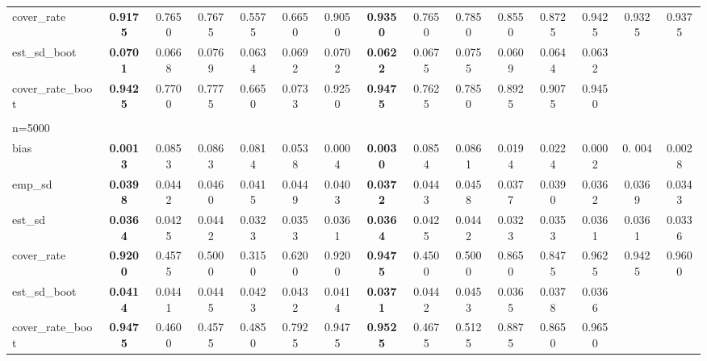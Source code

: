 \documentclass[11pt]{article}
\numberwithin{equation}{section}
\begin{document}
\begin{table}[]
{\begin{tabular}{lcccccccccccccc}
			cover\_rate & \textbf{0.9175} & 0.7650 & 0.7675 & 0.5575 & 0.6650 & 0.9050 & \textbf{0.9350} & 0.7650 & 0.7850 & 0.8550 & 0.8725 & 0.9425 & 0.9325 & 0.9375 \\
			est\_sd\_boot & \textbf{0.0701} & 0.0668 & 0.0769 & 0.0634 & 0.0692 & 0.0702 & \textbf{0.0622} & 0.0675 & 0.0755 & 0.0609 & 0.0644 & 0.0632 &  &  \\
			cover\_rate\_boot & \textbf{0.9425} & 0.7700 & 0.7775 & 0.6650 & 0.0733 & 0.9250 & \textbf{0.9475} & 0.7625 & 0.7850 & 0.8925 & 0.9075 & 0.9450 &  &  \\
			\\
			n=5000 &  &  &  &  &  &  &  &  &  &  &  &  &  &  \\
			\hline
			bias & \textbf{0.0013} & 0.0853 & 0.0863 & 0.0814 & 0.0538 & 0.0004 & \textbf{0.0030} & 0.0854 & 0.0861 & 0.0194 & 0.0224 & 0.0002 & 0. 004 & 0.0028 \\
			emp\_sd & \textbf{0.0398} & 0.0442 & 0.0460 & 0.0415 & 0.0449 & 0.0403 & \textbf{0.0372} & 0.0443 & 0.0458 & 0.0377 & 0.0390 & 0.0362 & 0.0369 & 0.0343 \\
			est\_sd & \textbf{0.0364} & 0.0425 & 0.0442 & 0.0323 & 0.0353 & 0.0361 & \textbf{0.0364} & 0.0425 & 0.0442 & 0.0323 & 0.0353 & 0.0361 & 0.0361 & 0.0336 \\
			cover\_rate & \textbf{0.9200} & 0.4575 & 0.5000 & 0.3150 & 0.6200 & 0.9200 & \textbf{0.9475} & 0.4500 & 0.5000 & 0.8650 & 0.8475 & 0.9625 & 0.9425 & 0.9600 \\
			est\_sd\_boot & \textbf{0.0414} & 0.0441 & 0.0445 & 0.0423 & 0.0432 & 0.0414 & \textbf{0.0371} & 0.0442 & 0.0453 & 0.0365 & 0.0378 & 0.0366 &  &  \\
			cover\_rate\_boot & \textbf{0.9475} & 0.4600 & 0.4575 & 0.4850 & 0.7925 & 0.9475 & \textbf{0.9525} & 0.4675 & 0.5125 & 0.8875 & 0.8650 & 0.9650 &  & \\
			\hline
		\end{tabular}
		\label{tab:simu_average_att_p10}
	}
	
\end{table}
\end{document}
